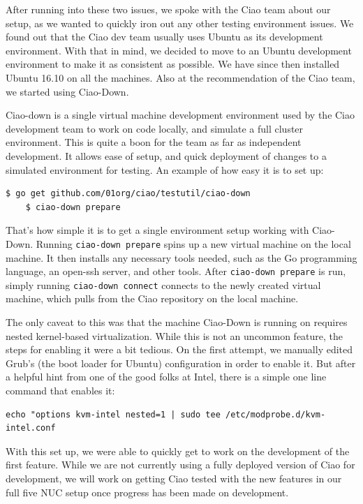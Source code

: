 \documentclass[10pt,onecolumn,journal,draftclsnofoot]{IEEEtran}
\begin{document}
After running into these two issues, we spoke with the Ciao team about our
setup, as we wanted to quickly iron out any other testing environment issues.
We found out that the Ciao dev team usually uses Ubuntu as its development
environment. With that in mind, we decided to move to an Ubuntu development
environment to make it as consistent as possible. We have since then installed
Ubuntu 16.10 on all the machines. Also at the recommendation of the Ciao team,
we started using Ciao-Down.

Ciao-down is a single virtual machine development
environment used by the Ciao development team to work on code locally, and 
simulate a full cluster environment. This is quite a boon for the team as far
as independent development. It allows ease of setup, and quick deployment of
changes to a simulated environment for testing. An example of how easy it is
to set up:\cite{ciao-down}

\begin{lstlisting}[caption = Simplicity of Ciao-Down setup]
	$ go get github.com/01org/ciao/testutil/ciao-down
	$ ciao-down prepare

\end{lstlisting}

That's how simple it is to get a single environment setup working with 
Ciao-Down. Running \texttt{ciao-down prepare} spins up a new virtual machine
on the local machine. It then installs any necessary tools needed, such as the
Go programming language, an open-ssh server, and other tools. After 
\texttt{ciao-down prepare} is run, simply running
\texttt{ciao-down connect} connects to the newly created virtual machine, which
pulls from the Ciao repository on the local machine.

The only caveat to this was that the machine Ciao-Down is running on requires
nested kernel-based virtualization. While this is not an uncommon feature, the
steps for enabling it were a bit tedious. On the first attempt, we manually
edited Grub's (the boot loader for Ubuntu) configuration in order to enable it.
But after a helpful hint from one of the good folks at Intel, there is a simple
one line command that enables it:

\begin{lstlisting}[caption = An easy way to enable nested KVM support]
	echo "options kvm-intel nested=1 | sudo tee /etc/modprobe.d/kvm-intel.conf
\end{lstlisting}


With this set up, we were
able to quickly get to work on the development of the first feature. While we
are not currently using a fully deployed version of Ciao for development, we
will work on getting Ciao tested with the new features in our full five NUC
setup once progress has been made on development.
\end{document}
